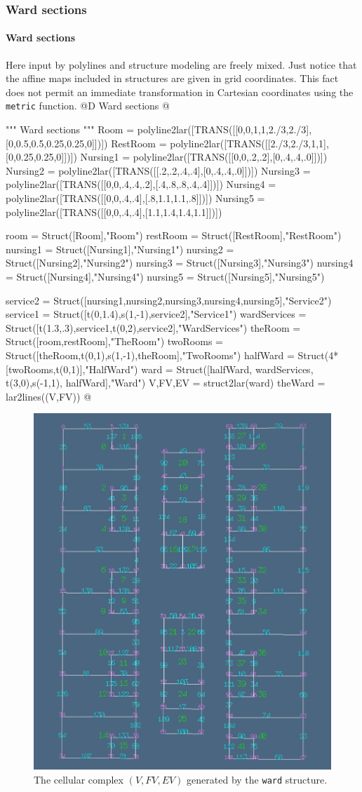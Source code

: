 \documentclass[11pt,oneside]{article}    %
\begin{document}
\subsubsection{Ward sections}
\paragraph{Ward sections}
Here input by polylines and structure modeling are freely mixed. Just notice that
the affine maps included in structures are given in grid coordinates. This fact 
does not permit an immediate transformation in Cartesian coordinates using the \texttt{metric}
function.
@D Ward sections
@{""" Ward sections """
Room = polyline2lar([TRANS([[0,0,1,1,2./3,2./3],[0,0.5,0.5,0.25,0.25,0]])])
RestRoom = polyline2lar([TRANS([[2./3,2./3,1,1],[0,0.25,0.25,0]])])
Nursing1 = polyline2lar([TRANS([[0,0,.2,.2],[0,.4,.4,.0]])])
Nursing2 = polyline2lar([TRANS([[.2,.2,.4,.4],[0,.4,.4,.0]])])
Nursing3 = polyline2lar([TRANS([[0,0,.4,.4,.2],[.4,.8,.8,.4,.4]])])
Nursing4 = polyline2lar([TRANS([[0,0,.4,.4],[.8,1.1,1.1,.8]])])
Nursing5 = polyline2lar([TRANS([[0,0,.4,.4],[1.1,1.4,1.4,1.1]])])

room = Struct([Room],"Room")
restRoom = Struct([RestRoom],"RestRoom")
nursing1 = Struct([Nursing1],"Nursing1")
nursing2 = Struct([Nursing2],"Nursing2")
nursing3 = Struct([Nursing3],"Nursing3")
nursing4 = Struct([Nursing4],"Nursing4")
nursing5 = Struct([Nursing5],"Nursing5")

service2 = Struct([nursing1,nursing2,nursing3,nursing4,nursing5],"Service2")
service1 = Struct([t(0,1.4),s(1,-1),service2],"Service1")
wardServices = Struct([t(1.3,.3),service1,t(0,2),service2],"WardServices")
theRoom = Struct([room,restRoom],"TheRoom")
twoRooms =  Struct([theRoom,t(0,1),s(1,-1),theRoom],"TwoRooms")
halfWard = Struct(4*[twoRooms,t(0,1)],"HalfWard")
ward = Struct([halfWard, wardServices, t(3,0),s(-1,1), halfWard],"Ward")
V,FV,EV = struct2lar(ward)
theWard = lar2lines((V,FV))
@}

\begin{figure}[htbp] %
   \centering
   \includegraphics[width=0.5\linewidth]{images/ward} 
   \caption{The cellular complex $(V,FV,EV)$ generated by the \texttt{ward} structure.}
   \label{fig:ward}
\end{figure}
\end{document}
